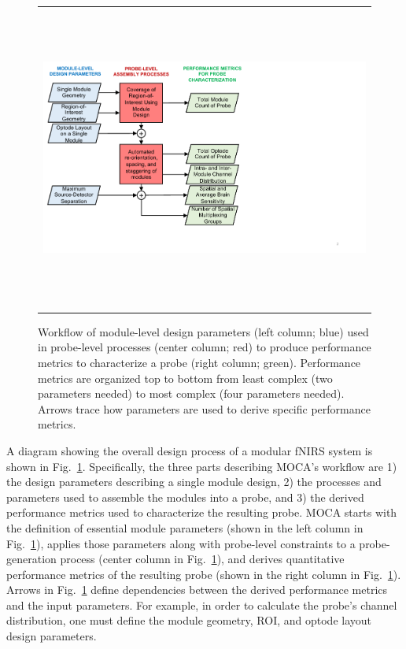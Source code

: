 \begin{figure}
    \begin{center}
    \begin{tabular}{c}
    \includegraphics[height=10cm]{fig/moca/Fig_1.pdf}
    \end{tabular}
    \end{center}
    \caption { \label{fig:flowchart} Workflow of module-level design parameters (left column; blue) used in probe-level processes (center column; red) to produce performance metrics to characterize a probe (right column; green). Performance metrics are organized top to bottom from least complex (two parameters needed) to most complex (four parameters needed). Arrows trace how parameters are used to derive specific performance metrics.} 
\end{figure} 

A diagram showing the overall design process of a modular \ac{fNIRS} system is shown in Fig.~\ref{fig:flowchart}. Specifically, the three parts describing MOCA's workflow are 1) the design parameters describing a single module design, 2) the processes and parameters used to assemble the modules into a probe, and 3) the derived performance metrics used to characterize the resulting probe. MOCA starts with the definition of essential module parameters (shown in the left column in Fig.~\ref{fig:flowchart}), applies those parameters along with probe-level constraints to a probe-generation process (center column in Fig.~\ref{fig:flowchart}), and derives quantitative performance metrics of the resulting probe (shown in the right column in Fig.~\ref{fig:flowchart}). Arrows in Fig.~\ref{fig:flowchart} define dependencies between the derived performance metrics and the input parameters. For example, in order to calculate the probe's channel distribution, one must define the module geometry, ROI, and optode layout design parameters. 

